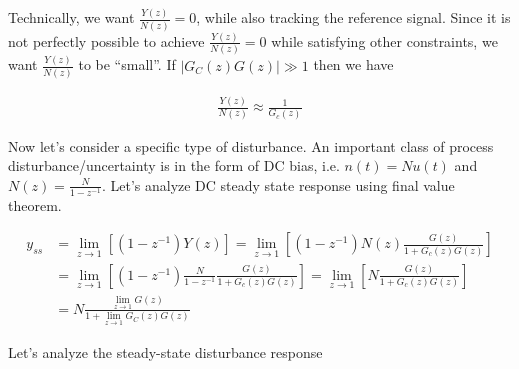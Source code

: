 \documentclass[twoside]{article}
\begin{document}
Technically, we want $\frac{Y(z)}{N(z)} = 0$, while also tracking
the reference signal. Since it is not perfectly possible to 
achieve $\frac{Y(z)}{N(z)} = 0$ while satisfying other constraints,
we want $\frac{Y(z)}{N(z)}$ to be ``small''. If $|G_C(z) G(z)| \gg 1$
then we have 

\begin{align*}
\frac{Y(z)}{N(z)} \approx \frac{1}{G_c(z)}
\end{align*}

Now let's consider a specific type of disturbance. An important
class of process disturbance/uncertainty is in the form of DC 
bias, i.e. $n(t) = N u(t)$ and $N(z) = \frac{N}{1 - z^{-1}}$. Let's
analyze DC steady state response using final value theorem.

\begin{align*}
y_{ss} &= \lim_{z\to1} \left[ \left( 1 - z^{-1} \right) Y(z) \right]
= \lim_{z\to1} \left[ \left( 1 - z^{-1} \right) N(z) \frac{G(z)}{1 +
  G_c(z) G(z)} \right]
\\
&= \lim_{z\to1} \left[ \left( 1 - z^{-1} \right) \frac{N}{1 - z^{-1}} \frac{G(z)}{1 +
  G_c(z) G(z)} \right]
= \lim_{z\to1} \left[ N \frac{G(z)}{1 +
  G_c(z) G(z)} \right]
\\
&= N \frac{\lim_{z\to1} G(z)}{1 + \lim_{z\to1} G_C(z) G(z) }
\end{align*}

Let's analyze the steady-state disturbance response
\end{document}
